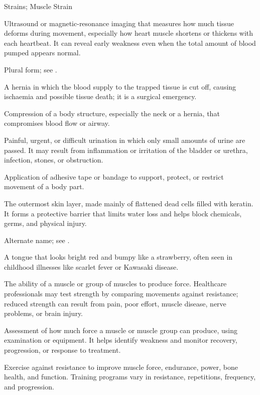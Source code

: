 \synonyms
Strains; Muscle Strain

 Ultrasound or magnetic-resonance imaging that measures how much tissue deforms during movement, especially how heart muscle shortens or thickens with each heartbeat. It can reveal early weakness even when the total amount of blood pumped appears normal.

 Plural form; see .

 A hernia in which the blood supply to the trapped tissue is cut off, causing ischaemia and possible tissue death; it is a surgical emergency.

 Compression of a body structure, especially the neck or a hernia, that compromises blood flow or airway.

 Painful, urgent, or difficult urination in which only small amounts of urine are passed. It may result from inflammation or irritation of the bladder or urethra, infection, stones, or obstruction.

 Application of adhesive tape or bandage to support, protect, or restrict movement of a body part.

 The outermost skin layer, made mainly of flattened dead cells filled with keratin. It forms a protective barrier that limits water loss and helps block chemicals, germs, and physical injury.

 Alternate name; see .

 A tongue that looks bright red and bumpy like a strawberry, often seen in childhood illnesses like scarlet fever or Kawasaki disease.

 The ability of a muscle or group of muscles to produce force. Healthcare professionals may test strength by comparing movements against resistance; reduced strength can result from pain, poor effort, muscle disease, nerve problems, or brain injury.

 Assessment of how much force a muscle or muscle group can produce, using examination or equipment. It helps identify weakness and monitor recovery, progression, or response to treatment.

 Exercise against resistance to improve muscle force, endurance, power, bone health, and function. Training programs vary in resistance, repetitions, frequency, and progression.

